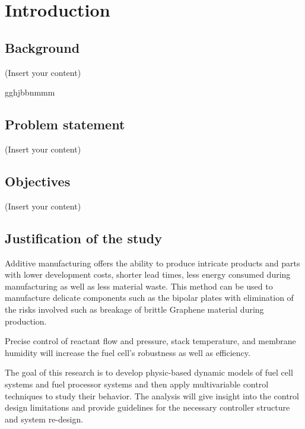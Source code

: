 \section{Introduction}
\label{sec:introduction}
\subsection{Background}
(Insert your content)

gghjbbnmmm

\subsection{Problem statement}
(Insert your content)
\subsection{Objectives}
(Insert your content)
\subsection{Justification of the study}
Additive manufacturing offers the ability to produce intricate products and parts with lower development costs, shorter lead times, less energy consumed during manufacturing as well as less material waste. This method can be used to manufacture delicate components such as the bipolar plates with elimination of the risks involved such as breakage of brittle Graphene material during production.     

Precise control of reactant flow and pressure, stack temperature, and membrane humidity will increase the fuel cell’s robustness as well as efficiency.

The goal of this research is to develop physic-based dynamic models of fuel cell systems and fuel processor systems and then apply multivariable control techniques to study their behavior. The analysis will give insight into the control design limitations and provide guidelines for the necessary controller structure and system re-design.